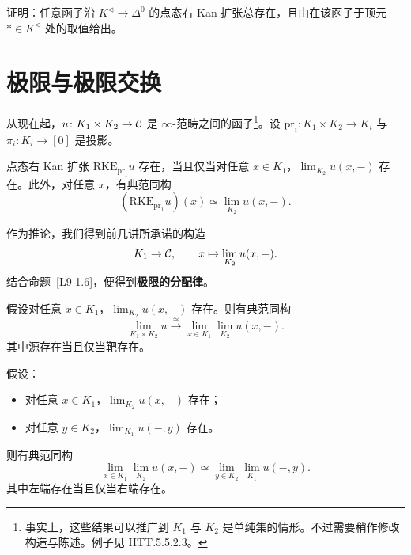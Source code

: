 \begin{exercise}\label{L9-1.18}
证明：任意函子沿 $K^{\triangleleft}\to\Delta^0$ 的点态右 Kan 扩张总存在，且由在该函子于顶元 $\ast\in K^{\triangleleft}$ 处的取值给出。
\end{exercise}

\section{极限与极限交换}

\nitem\label{L9-2.1} 从现在起，$u\colon K_1\times K_2\to\mathcal{C}$ 是 $\infty$-范畴之间的函子\footnote{事实上，这些结果可以推广到 $K_1$ 与 $K_2$ 是单纯集的情形。不过需要稍作修改构造与陈述。例子见 HTT.5.5.2.3。}。设 $\mathrm{pr}_i\colon K_1\times K_2\to K_i$ 与 $\pi_i\colon K_i\to[0]$ 是投影。

\begin{exercise}\label{L9-2.2}
点态右 Kan 扩张 $\mathrm{RKE}_{\mathrm{pr}_1}u$ 存在，当且仅当对任意 $x\in K_1$，$\lim_{K_2}u(x,-)$ 存在。此外，对任意 $x$，有典范同构
\[
(\mathrm{RKE}_{\mathrm{pr}_1}u)(x)\simeq\lim_{K_2}u(x,-).
\]
\end{exercise}

\nitem\label{L9-2.3} 作为推论，我们得到前几讲所承诺的构造
\[
K_1\to\mathcal{C},\qquad x\mapsto\lim_{K_2}u(x,-).
\]
结合命题~\ref{L9-1.6}，便得到\textbf{极限的分配律}。


\begin{corollary}\label{L9-2.4}
假设对任意 $x\in K_1$，$\lim_{K_2}u(x,-)$ 存在。则有典范同构
\[
\lim_{K_1\times K_2}u\xrightarrow{\ \simeq\ }\lim_{x\in K_1}\lim_{K_2}u(x,-).
\]
其中源存在当且仅当靶存在。
\end{corollary}

\begin{corollary}\label{L9-2.5}
假设：
\begin{itemize}[leftmargin=2.2em,itemsep=0.1em]
\item 对任意 $x\in K_1$，$\lim_{K_2}u(x,-)$ 存在；
\item 对任意 $y\in K_2$，$\lim_{K_1}u(-,y)$ 存在。
\end{itemize}
则有典范同构
\[
\lim_{x\in K_1}\lim_{K_2}u(x,-)\simeq\lim_{y\in K_2}\lim_{K_1}u(-,y).
\]
其中左端存在当且仅当右端存在。
\end{corollary}

